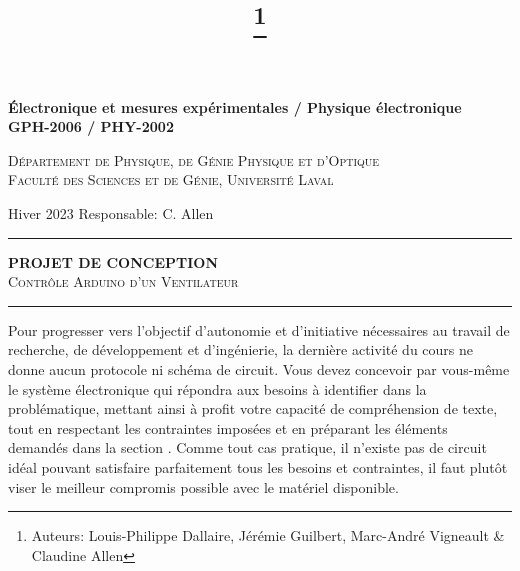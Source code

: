 \documentclass[english,french,12pt]{article}
\title{\vspace{-7em}\thanks{Auteurs: Louis-Philippe Dallaire, Jérémie Guilbert, Marc-André Vigneault \& Claudine Allen}}
\date{}
\begin{document}
\maketitle\thispagestyle{fancy}
%
%
\begin{center}
    \textbf{\large{Électronique et mesures expérimentales / Physique électronique}}\\
    \vspace{0.2em}
    \textbf{GPH-2006 / PHY-2002}

    \textsc{Département de Physique, de Génie Physique et d'Optique\\
    Faculté des Sciences et de Génie, Université Laval}
\end{center}

\vspace{-1em}
\noindent Hiver 2023 \hfill Responsable: C. Allen\par
\vspace{0.2ex}
\hrule
\vspace{0.5ex}
\centering
    \textbf{PROJET DE CONCEPTION}\\
    \textsc{Contrôle Arduino d'un Ventilateur}\par
\vspace{2ex}
\hrule
\justify
\vspace{-1ex}
Pour progresser vers l'objectif d'autonomie et d'initiative nécessaires au travail de recherche, de développement et d'ingénierie, la dernière activité du cours ne donne aucun protocole ni schéma de circuit. Vous devez concevoir par vous-même le système électronique qui répondra aux besoins à identifier dans la problématique, mettant ainsi à profit votre capacité de compréhension de texte, tout en respectant les contraintes imposées et en préparant les éléments demandés dans la section . Comme tout cas pratique, il n'existe pas de circuit idéal pouvant satisfaire parfaitement tous les besoins et contraintes, il faut plutôt viser le meilleur compromis possible avec le matériel disponible.
\end{document}

